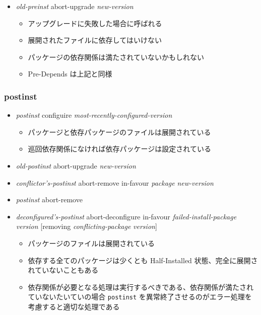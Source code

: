 \documentclass[mingoth,a4paper]{jsarticle}
\begin{document}
\begin{itemize}
\item {\it old-preinst} abort-upgrade {\it new-version}
  \begin{itemize}
  \item アップグレードに失敗した場合に呼ばれる
  \item 展開されたファイルに依存してはいけない
  \item パッケージの依存関係は満たされていないかもしれない
  \item Pre-Depends は上記と同様
  \end{itemize}
\end{itemize}


\clearpage

\subsubsection{postinst}

\begin{itemize}
\item {\it postinst} configuire {\it most-recently-configured-version}
  \begin{itemize}
  \item パッケージと依存パッケージのファイルは展開されている
  \item 巡回依存関係になければ依存パッケージは設定されている
  \end{itemize}
\end{itemize}

\begin{itemize}
\item {\it old-postinst} abort-upgrade {\it new-version}
\item {\it conflictor's-postinst} abort-remove in-favour {\it package} {\it new-version}
\item {\it postinst} abort-remove
\item {\it deconfigured's-postinst} abort-deconfigure in-favour {\it failed-install-package} {\it version} [removing {\it conflicting-package} {\it version}]
  \begin{itemize}
  \item パッケージのファイルは展開されている
  \item 依存する全てのパッケージは少くとも Half-Installed 状態、完全に展開されていないこともある
  \item 依存関係が必要となる処理は実行するべきである、依存関係が満たされていないたいていの場合 {\tt postinst} を異常終了させるのがエラー処理を考慮すると適切な処理である
  \end{itemize}
\end{itemize}
\end{document}

